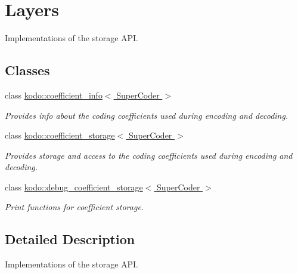 \hypertarget{group__coefficient__storage__layers}{\section{Layers}
\label{group__coefficient__storage__layers}
}


Implementations of the storage A\-P\-I.  


\subsection*{Classes}
\begin{DoxyCompactItemize}
\item 
class \hyperlink{classkodo_1_1coefficient__info}{kodo\-::coefficient\-\_\-info$<$ Super\-Coder $>$}
\begin{DoxyCompactList}\small\item\em Provides info about the coding coefficients used during encoding and decoding. \end{DoxyCompactList}\item 
class \hyperlink{classkodo_1_1coefficient__storage}{kodo\-::coefficient\-\_\-storage$<$ Super\-Coder $>$}
\begin{DoxyCompactList}\small\item\em Provides storage and access to the coding coefficients used during encoding and decoding. \end{DoxyCompactList}\item 
class \hyperlink{classkodo_1_1debug__coefficient__storage}{kodo\-::debug\-\_\-coefficient\-\_\-storage$<$ Super\-Coder $>$}
\begin{DoxyCompactList}\small\item\em Print functions for coefficient storage. \end{DoxyCompactList}\end{DoxyCompactItemize}


\subsection{Detailed Description}
Implementations of the storage A\-P\-I. 